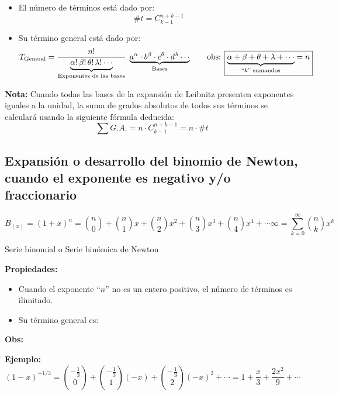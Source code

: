 \documentclass[11pt,a4paper]{article}
\begin{document}
\begin{itemize}[label=\textcolor{naranja}{\checkmark}]
  \item El número de términos está dado por:
  \[\#t = C^{n+k-1}_{k-1}\]
  \item Su término general está dado por:
  \[
  T_{\text{General}} = \frac{n!}{\underbrace{\alpha!\,\beta!\,\theta!\,\lambda!\cdots}_{\text{Exponentes de las bases}}}\;
  \underbrace{a^{\alpha}\cdot b^{\beta}\cdot c^{\theta}\cdot d^{\lambda}\cdots}_{\text{Bases}}
  \qquad \text{obs: } \fbox{$\underbrace{\alpha + \beta + \theta + \lambda + \cdots}_{\text{``$k$'' sumandos}} = n$}
  \]
\end{itemize}

\textbf{Nota:} Cuando todas las bases de la expansión de Leibnitz presenten exponentes
iguales a la unidad, la suma de grados absolutos de todos sus términos se calculará
usando la siguiente fórmula deducida:
\[\sum G.A. = n\cdot C^{n+k-1}_{k-1} = n\cdot\#t\]

\subsection*{\textcolor{rojo}{Expansión o desarrollo del binomio de Newton, cuando el exponente es negativo y/o fraccionario}}
\[
B_{(x)} = (1+x)^n = \binom{n}{0} + \binom{n}{1}x + \binom{n}{2}x^2 + \binom{n}{3}x^3 + \binom{n}{4}x^4 + \cdots\infty
= \sum_{k=0}^{\infty}\binom{n}{k}x^k
\]
\begin{center}
\textcolor{azul}{Serie binomial o Serie binómica de Newton}
\end{center}

\textbf{Propiedades:}
\begin{itemize}[label=\textcolor{magenta}{\checkmark}]
  \item Cuando el exponente ``$n$'' no es un entero positivo, el número de términos es ilimitado.
  \item Su término general es: \ 
\end{itemize}

\textbf{Obs:} \ 

\medskip
\textbf{Ejemplo:}
\[
(1-x)^{-1/3} = \binom{-\frac{1}{3}}{0} + \binom{-\frac{1}{3}}{1}(-x) + \binom{-\frac{1}{3}}{2}(-x)^2 + \cdots = 1 + \frac{x}{3} + \frac{2x^2}{9} + \cdots
\]


\newpage
\end{document}
